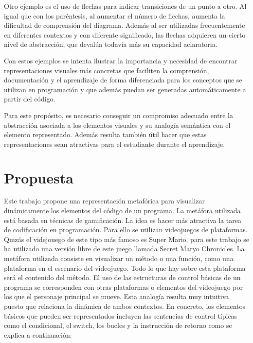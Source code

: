 \documentclass{llncs}
\begin{document}
Otro ejemplo es el uso de flechas para indicar transiciones de un punto a otro. Al igual que con los paréntesis, al aumentar el número de flechas, aumenta la dificultad de comprensión del diagrama. Además al ser utilizadas frecuentemente en diferentes contextos y con diferente significado, las flechas adquieren un cierto nivel de abstracción, que devalúa todavía más su capacidad aclaratoria. 

Con estos ejemplos se intenta ilustrar la importancia y necesidad de encontrar representaciones visuales más concretas que faciliten la comprensión, documentación y el aprendizaje de forma diferenciada para los conceptos que se utilizan en programación y que además puedan ser generadas automáticamente a partir del código. 

Para este propósito, es necesario conseguir un compromiso adecuado entre la abstracción asociada a los elementos visuales y su analogía semántica con el elemento representado. Además resulta también útil hacer que estas representaciones sean atractivas para el estudiante durante el aprendizaje.



\section{Propuesta}
\label{sec:proposal}

Este trabajo propone una representación metafórica para visualizar dinámicamente los elementos del código de un programa. La metáfora utilizada está basada en técnicas de gamificación. La idea es hacer más atractiva la tarea de codificación en programación. Para ello se utilizan videojuegos de plataformas. Quizás el videjouego de este tipo más famoso es Super Mario, para este trabajo se ha utilizado una versión libre de este juego llamada Secret Maryo Chronicles. La metáfora utilizada consiste en visualizar un método o una función, como una plataforma en el escenario del videojuego. Todo lo que hay sobre esta plataforma será el contenido del método. El uso de las estructuras de control básicas de un programa se corresponden con otras plataformas o elementos del videojuego por los que el personaje principal se mueve. Esta analogía resulta muy intuitiva puesto que relaciona la dinámica de ambos contextos. En concreto, los elementos básicos que pueden ser representados incluyen las sentencias de control típicas como el condicional, el switch, los bucles y la instrucción de retorno como se explica a continuación: 
\end{document}
